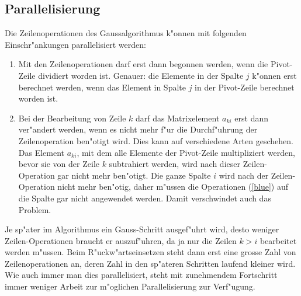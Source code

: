\subsection{Parallelisierung}
Die Zeilenoperationen des Gaussalgorithmus k"onnen mit folgenden
Einschr"ankungen parallelisiert werden:
\begin{enumerate}
\item Mit den Zeilenoperationen darf erst dann begonnen werden,
wenn die Pivot-Zeile dividiert worden ist. Genauer: die Elemente
in der Spalte $j$ k"onnen erst berechnet werden, wenn das Element in Spalte
$j$ in der Pivot-Zeile berechnet worden ist.
\item Bei der Bearbeitung von Zeile $k$ darf das Matrixelement $a_{ki}$
erst dann ver"andert werden, wenn es nicht mehr f"ur die Durchf"uhrung
der Zeilenoperation ben"otigt wird. Dies kann auf verschiedene Arten
geschehen.
Das Element $a_{ki}$, mit dem alle Elemente
der Pivot-Zeile multipliziert werden, bevor sie von der Zeile $k$ subtrahiert
werden, wird nach dieser Zeilen-Operation gar nicht mehr ben"otigt.
Die ganze Spalte $i$ wird nach der Zeilen-Operation nicht mehr ben"otig,
daher m"ussen die Operationen (\ref{blue}) auf die Spalte gar nicht
angewendet werden. Damit verschwindet auch das Problem.
\end{enumerate}

Je sp"ater im Algorithmus ein Gauss-Schritt ausgef"uhrt wird, desto
weniger Zeilen-Operationen braucht er auszuf"uhren,
da ja nur die Zeilen $k>i$ bearbeitet werden m"ussen.
Beim R"uckw"artseinsetzen steht dann erst eine grosse Zahl von
Zeilenoperationen an, deren Zahl in den sp"ateren Schritten
laufend kleiner wird.
Wie auch immer
man dies parallelisiert, steht mit zunehmendem Fortschritt immer
weniger Arbeit zur m"oglichen Parallelisierung zur Verf"ugung.

